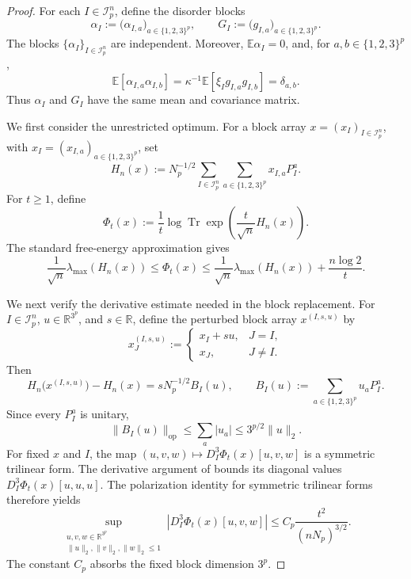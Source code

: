 \documentclass[12pt]{article}
\newcommand{\E}{\mathbb{E}}
\newcommand{\R}{\mathbb{R}}
\newcommand{\mcI}{\mathcal{I}}
\begin{document}
\begin{appendix}
\begin{proof}
For each \(I\in\mcI_p^n\), define the disorder blocks
\[
    \alpha_I
    :=
    \bigl(\alpha_{I,a}\bigr)_{a\in\{1,2,3\}^p},
    \qquad
    G_I
    :=
    \bigl(g_{I,a}\bigr)_{a\in\{1,2,3\}^p}.
\]
The blocks \(\{\alpha_I\}_{I\in\mcI_p^n}\) are independent. Moreover,
\(\E\alpha_I=0\), and, for \(a,b\in\{1,2,3\}^p\),
\[
    \E[\alpha_{I,a}\alpha_{I,b}]
    =
    \kappa^{-1}\E[\xi_Ig_{I,a}g_{I,b}]
    =
    \delta_{a,b}.
\]
Thus \(\alpha_I\) and \(G_I\) have the same mean and covariance matrix.

We first consider the unrestricted optimum. For a block array
\(x=(x_I)_{I\in\mcI_p^n}\), with
\(x_I=(x_{I,a})_{a\in\{1,2,3\}^p}\), set
\[
    H_n(x)
    :=
    N_p^{-1/2}
    \sum_{I\in\mcI_p^n}
    \sum_{a\in\{1,2,3\}^p}
    x_{I,a}P_I^a.
\]
For \(t\ge1\), define
\[
    \Phi_t(x)
    :=
    \frac1t
    \log\operatorname{Tr}
    \exp\left(
        \frac{t}{\sqrt n}H_n(x)
    \right).
\]
The standard free-energy approximation
\cite[Eq.~(150)--(151)]{anschuetz2025bounds} gives
\[
    \frac1{\sqrt n}\lambda_{\max}(H_n(x))
    \le
    \Phi_t(x)
    \le
    \frac1{\sqrt n}\lambda_{\max}(H_n(x))
    +
    \frac{n\log2}{t}.
\]

We next verify the derivative estimate needed in the block replacement.
For \(I\in\mcI_p^n\), \(u\in\R^{3^p}\), and \(s\in\R\), define the
perturbed block array \(x^{(I,s,u)}\) by
\[
    x_J^{(I,s,u)}
    :=
    \begin{cases}
        x_I+su, & J=I,\\
        x_J, & J\neq I.
    \end{cases}
\]
Then
\[
    H_n\bigl(x^{(I,s,u)}\bigr)-H_n(x)
    =
    sN_p^{-1/2}B_I(u),
    \qquad
    B_I(u):=\sum_{a\in\{1,2,3\}^p}u_aP_I^a.
\]
Since every \(P_I^a\) is unitary,
\[
    \|B_I(u)\|_{\mathrm{op}}
    \le
    \sum_a|u_a|
    \le
    3^{p/2}\|u\|_2.
\]
For fixed \(x\) and \(I\), the map $(u,v,w)\longmapsto D_I^3\Phi_t(x)[u,v,w]$ is a symmetric trilinear form. The derivative argument of
\cite[Lemma~26]{anschuetz2025bounds} bounds its diagonal values
\(D_I^3\Phi_t(x)[u,u,u]\). The polarization identity for symmetric
trilinear forms therefore yields
\[
    \sup_{\substack{u,v,w\in\R^{3^p}\\
                    \|u\|_2,\|v\|_2,\|w\|_2\le1}}
    \left|
        D_I^3\Phi_t(x)[u,v,w]
    \right|
    \le
    C_p\frac{t^2}{(nN_p)^{3/2}}.
\]
The constant \(C_p\) absorbs the fixed block dimension \(3^p\).


\end{proof}
\end{appendix}
\end{document}

